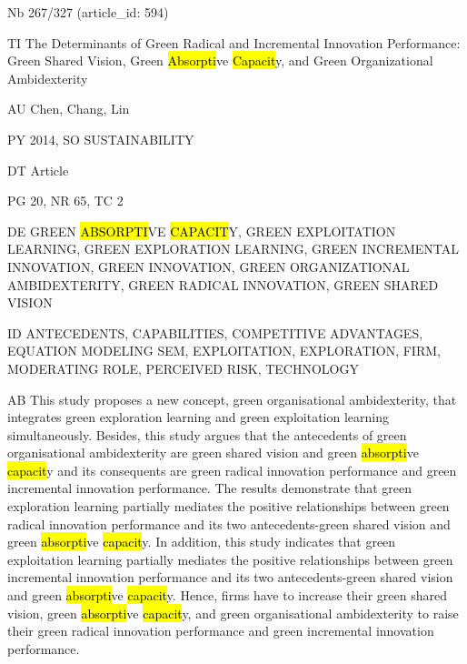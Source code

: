\documentclass[a4paper]{article}
\begin{document}
\vspace*{-2cm}
Nb \tabto{0cm}267/327 (article\_id: 594)\par
TI \tabto{0cm}The Determinants of Green Radical and Incremental Innovation Performance: Green Shared Vision, Green \hl{Absorpti}ve \hl{Capacit}y, and Green Organizational Ambidexterity\par
AU \tabto{0cm}Chen, Chang, Lin\par
PY \tabto{0cm}2014, SO SUSTAINABILITY\par
DT \tabto{0cm}Article\par
PG \tabto{0cm}20, NR 65, TC 2\par
DE \tabto{0cm}GREEN \hl{ABSORPTI}VE \hl{CAPACIT}Y, GREEN EXPLOITATION LEARNING, GREEN EXPLORATION LEARNING, GREEN INCREMENTAL INNOVATION, GREEN INNOVATION, GREEN ORGANIZATIONAL AMBIDEXTERITY, GREEN RADICAL INNOVATION, GREEN SHARED VISION\par
ID \tabto{0cm}ANTECEDENTS, CAPABILITIES, COMPETITIVE ADVANTAGES, EQUATION MODELING SEM, EXPLOITATION, EXPLORATION, FIRM, MODERATING ROLE, PERCEIVED RISK, TECHNOLOGY\par
AB \tabto{0cm}This study proposes a new concept, green organisational ambidexterity, that integrates green exploration learning and green exploitation learning simultaneously. Besides, this study argues that the antecedents of green organisational ambidexterity are green shared vision and green \hl{absorpti}ve \hl{capacit}y and its consequents are green radical innovation performance and green incremental innovation performance. The results demonstrate that green exploration learning partially mediates the positive relationships between green radical innovation performance and its two antecedents-green shared vision and green \hl{absorpti}ve \hl{capacit}y. In addition, this study indicates that green exploitation learning partially mediates the positive relationships between green incremental innovation performance and its two antecedents-green shared vision and green \hl{absorpti}ve \hl{capacit}y. Hence, firms have to increase their green shared vision, green \hl{absorpti}ve \hl{capacit}y, and green organisational ambidexterity to raise their green radical innovation performance and green incremental innovation performance.\par
\clearpage
\end{document}
